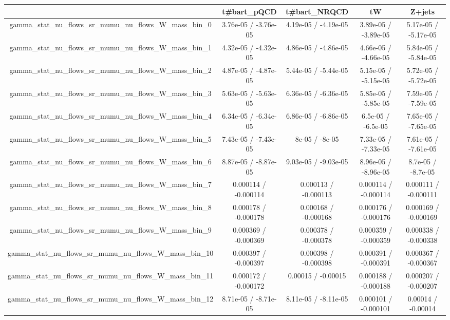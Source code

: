 \documentclass[10pt]{article}
\begin{document}
\begin{table}[htbp]
\begin{center}
\begin{tabular}{|c|c|c|c|c|}
\hline 
      & t#bar{t}_{pQCD}      & t#bar{t}_{NRQCD}      & tW      & Z+jets \\ 
\hline 
  gamma_stat_nu_flows_sr_mumu_nu_flows_W_mass_bin_0 & 3.76e-05 / -3.76e-05 & 4.19e-05 / -4.19e-05 & 3.89e-05 / -3.89e-05 & 5.17e-05 / -5.17e-05 \\ 
  gamma_stat_nu_flows_sr_mumu_nu_flows_W_mass_bin_1 & 4.32e-05 / -4.32e-05 & 4.86e-05 / -4.86e-05 & 4.66e-05 / -4.66e-05 & 5.84e-05 / -5.84e-05 \\ 
  gamma_stat_nu_flows_sr_mumu_nu_flows_W_mass_bin_2 & 4.87e-05 / -4.87e-05 & 5.44e-05 / -5.44e-05 & 5.15e-05 / -5.15e-05 & 5.72e-05 / -5.72e-05 \\ 
  gamma_stat_nu_flows_sr_mumu_nu_flows_W_mass_bin_3 & 5.63e-05 / -5.63e-05 & 6.36e-05 / -6.36e-05 & 5.85e-05 / -5.85e-05 & 7.59e-05 / -7.59e-05 \\ 
  gamma_stat_nu_flows_sr_mumu_nu_flows_W_mass_bin_4 & 6.34e-05 / -6.34e-05 & 6.86e-05 / -6.86e-05 & 6.5e-05 / -6.5e-05 & 7.65e-05 / -7.65e-05 \\ 
  gamma_stat_nu_flows_sr_mumu_nu_flows_W_mass_bin_5 & 7.43e-05 / -7.43e-05 & 8e-05 / -8e-05 & 7.33e-05 / -7.33e-05 & 7.61e-05 / -7.61e-05 \\ 
  gamma_stat_nu_flows_sr_mumu_nu_flows_W_mass_bin_6 & 8.87e-05 / -8.87e-05 & 9.03e-05 / -9.03e-05 & 8.96e-05 / -8.96e-05 & 8.7e-05 / -8.7e-05 \\ 
  gamma_stat_nu_flows_sr_mumu_nu_flows_W_mass_bin_7 & 0.000114 / -0.000114 & 0.000113 / -0.000113 & 0.000114 / -0.000114 & 0.000111 / -0.000111 \\ 
  gamma_stat_nu_flows_sr_mumu_nu_flows_W_mass_bin_8 & 0.000178 / -0.000178 & 0.000168 / -0.000168 & 0.000176 / -0.000176 & 0.000169 / -0.000169 \\ 
  gamma_stat_nu_flows_sr_mumu_nu_flows_W_mass_bin_9 & 0.000369 / -0.000369 & 0.000378 / -0.000378 & 0.000359 / -0.000359 & 0.000338 / -0.000338 \\ 
  gamma_stat_nu_flows_sr_mumu_nu_flows_W_mass_bin_10 & 0.000397 / -0.000397 & 0.000398 / -0.000398 & 0.000391 / -0.000391 & 0.000367 / -0.000367 \\ 
  gamma_stat_nu_flows_sr_mumu_nu_flows_W_mass_bin_11 & 0.000172 / -0.000172 & 0.00015 / -0.00015 & 0.000188 / -0.000188 & 0.000207 / -0.000207 \\ 
  gamma_stat_nu_flows_sr_mumu_nu_flows_W_mass_bin_12 & 8.71e-05 / -8.71e-05 & 8.11e-05 / -8.11e-05 & 0.000101 / -0.000101 & 0.00014 / -0.00014 \\ 

\end{tabular}
\end{center}
\end{table}
\end{document}
